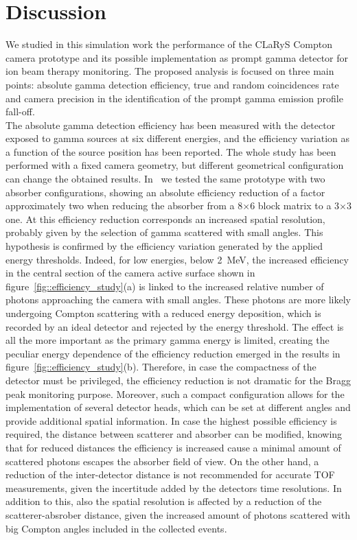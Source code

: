 \section{Discussion}

We studied in this simulation work the performance of the CLaRyS Compton camera prototype and its possible implementation as prompt gamma detector for ion beam therapy monitoring. The proposed analysis is focused on three main points: absolute gamma detection efficiency, true and random coincidences rate and camera precision in the identification of the prompt gamma emission profile fall-off.\\
The absolute gamma detection efficiency has been measured with the detector exposed to gamma sources at six different energies, and the efficiency variation as a function of the source position has been reported. The whole study has been performed with a fixed camera geometry, but different geometrical configuration can change the obtained results. In~\cite{Fontana_APPB} we tested the same prototype with two absorber configurations, showing an absolute efficiency reduction of a factor approximately two when reducing the absorber from a 8$\times$6 block matrix to a 3$\times$3 one. At this efficiency reduction corresponds an increased spatial resolution, probably given by the selection of gamma scattered with small angles. This hypothesis is confirmed by the efficiency variation generated by the applied energy thresholds. Indeed, for low energies, below 2~MeV, the increased efficiency in the central section of the camera active surface shown in figure~\ref{fig::efficiency_study}(a) is linked to the increased relative number of photons approaching the camera with small angles. These photons are more likely undergoing Compton scattering with a reduced energy deposition, which is recorded by an ideal detector and rejected by the energy threshold. The effect is all the more important as the primary gamma energy is limited, creating the peculiar energy dependence of the efficiency reduction emerged in the results in figure~\ref{fig::efficiency_study}(b). Therefore, in case the compactness of the detector must be privileged, the efficiency reduction is not dramatic for the Bragg peak monitoring purpose. Moreover, such a compact configuration allows for the implementation of several detector heads, which can be set at different angles and provide additional spatial information. In case the highest possible efficiency is required, the distance between scatterer and absorber can be modified, knowing that for reduced distances the efficiency is increased cause a minimal amount of scattered photons escapes the absorber field of view. On the other hand, a reduction of the inter-detector distance is not recommended for accurate TOF measurements, given the incertitude added by the detectors time resolutions. In addition to this, also the spatial resolution is affected by a reduction of the scatterer-absrober distance, given the increased amount of photons scattered with big Compton angles included in the collected events.   
